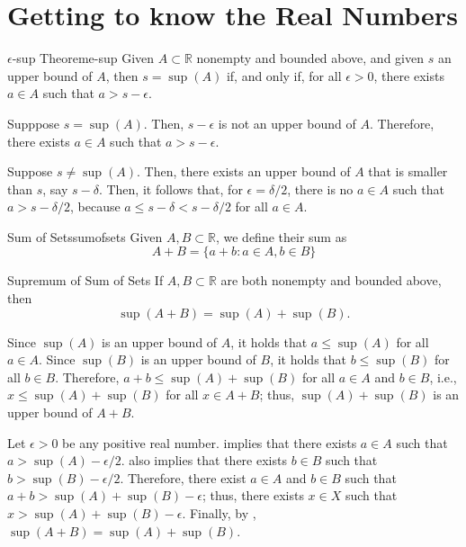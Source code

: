 \chapter{Getting to know the Real Numbers}


\begin{thm}{\(\epsilon\)-sup Theorem}{e-sup}
	Given \(A \subset \mathbb{R}\) nonempty and bounded above, and given \(s\) an upper bound of \(A\), then \(s = \sup(A)\) if, and only if, for all \(\epsilon > 0\), there exists \(a \in A\) such that \(a > s - \epsilon\).
\end{thm}

\begin{dem}{}{}
	Supppose \(s = \sup(A)\). Then, \(s - \epsilon\) is not an upper bound of \(A\). Therefore, there exists \(a \in A\) such that \(a > s - \epsilon\).

	Suppose \(s \neq \sup(A)\). Then, there exists an upper bound of \(A\) that is smaller than \(s\), say \(s - \delta\). Then, it follows that, for \(\epsilon = \delta / 2\), there is no \(a \in A\) such that \(a > s - \delta/2\), because  \(a \leq s - \delta < s - \delta/2\) for all \(a \in A\).
\end{dem}

\begin{defn}{Sum of Sets}{sumofsets}
	Given \(A, B \subset \mathbb{R}\), we define their sum as \[
		A + B = \{a + b : a \in A, b \in B\}
	\]
\end{defn}

\begin{thm}{Supremum of Sum of Sets}{}
	If \(A, B \subset \mathbb{R}\) are both nonempty and bounded above, then \[
		\sup(A+B) = \sup(A) + \sup(B).
	\]
\end{thm}

\begin{dem}{}{}
	Since \(\sup(A)\) is an upper bound of \(A\), it holds that \(a \leq \sup(A)\) for all \(a \in A\).
	Since \(\sup(B)\) is an upper bound of \(B\), it holds that \(b \leq \sup(B)\) for all \(b \in B\).
	Therefore, \(a + b \leq \sup(A) + \sup(B)\) for all \(a \in A\) and \(b \in B\), i.e., \(x \leq \sup(A) + \sup(B)\) for all \(x \in A + B\); thus, \(\sup(A) + \sup(B)\) is an upper bound of \(A + B\).

	Let \(\epsilon > 0\) be any positive real number.
	 implies that there exists \(a \in A\) such that \(a > \sup(A) - \epsilon/2\).
	 also implies that there exists \(b \in B\) such that \(b > \sup(B) - \epsilon/2\).
	Therefore, there exist \(a \in A\) and \(b \in B\) such that \(a + b > \sup(A) + \sup(B) - \epsilon\); thus, there exists \(x \in X\) such that \(x > \sup(A) + \sup(B) - \epsilon\).
	Finally, by , \(\sup(A+B) = \sup(A) + \sup(B)\).
\end{dem}
